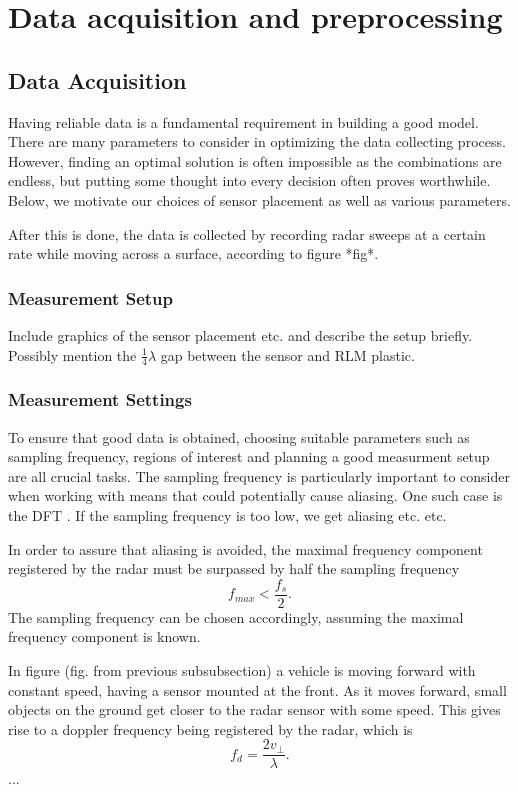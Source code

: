 \chapter{Data acquisition and preprocessing}
\section{Data Acquisition}
Having reliable data is a fundamental requirement in building a good model. There are many parameters to consider in optimizing the data collecting process. However,  finding an optimal solution is often impossible as the combinations are endless, but putting some thought into every decision often proves worthwhile. Below, we motivate our choices of sensor placement as well as various parameters.

After this is done, the data is collected by recording radar sweeps at a certain rate while moving across a surface, according to figure *fig*.

\subsection{Measurement Setup}


Include graphics of the sensor placement etc. and describe the setup briefly. Possibly mention the $\frac14\lambda$ gap between the sensor and RLM plastic.
\subsection{Measurement Settings}
To ensure that good data is obtained, choosing suitable parameters such as sampling frequency, regions of interest and planning a good measurment setup are all crucial tasks. The sampling frequency is particularly important to consider when working with means that could potentially cause aliasing. One such case is the DFT \citep{lindgren_rootzeŽn_sandsten_2013}. If the sampling frequency is too low, we get aliasing etc. etc. 

In order to assure that aliasing is avoided, the maximal frequency component registered by the radar must be surpassed by half the sampling frequency
\begin{equation}
	f_{max} < \frac{f_s}{2}.
\end{equation}
The sampling frequency can be chosen accordingly, assuming the maximal frequency component is known. 

In figure (fig. from previous subsubsection) a vehicle is moving forward with constant speed, having a sensor mounted at the front. As it moves forward, small objects on the ground get closer to the radar sensor with some speed. This gives rise to a doppler frequency being registered by the radar, which is \citep{lien_gillian_karagozler_amihood_schwesig_olson_raja_poupyrev_2016}
\begin{equation}
	f_{d} = \frac{2v_\perp}{\lambda}.
\end{equation}
...

